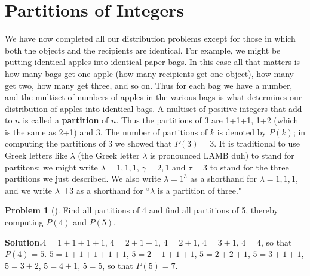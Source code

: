 \documentclass[10pt,]{book}
\newcommand{\terminology}[1]{\textbf{#1}}
\theoremstyle{plain}
\theoremstyle{definition}
\newtheorem{activity}[project]{Problem}
\theoremstyle{definition}
\numberwithin{equation}{chapter}
\begin{document}
\section[{Partitions of Integers}]{Partitions of Integers}\label{section-9}
We have now completed all our distribution problems except for those in which both the objects and the recipients are identical. For example, we might be putting identical apples into identical paper bags. In this case all that matters is how many bags get one apple (how many recipients get one object), how many get two, how many get three, and so on. Thus for each bag we have a number, and the multiset of numbers of apples in the various bags is what determines our distribution of apples into identical bags. A multiset of positive integers that add to \(n\) is called a \terminology{partition} of \(n\). Thus the partitions of 3 are 1+1+1, 1+2 (which is the same as 2+1) and 3. The number of partitions of \(k\) is denoted by \(P(k)\); in computing the partitions of 3 we showed that \(P(3) = 3\). It is traditional to use Greek letters like \(\lambda\) (the Greek letter \(\lambda\) is pronounced LAMB duh) to stand for partitons; we might write \(\lambda= 1,1,1\), \(\gamma= 2,1\) and \(\tau = 3\) to stand for the three partitions we just described. We also write \(\lambda = 1^3\) as a shorthand for \(\lambda = 1,1,1\), and we write \(\lambda \dashv 3\) as a shorthand for ``\(\lambda\) is a partition of three."%
\begin{activity}[]\label{activity-157}
Find all partitions of 4 and find all partitions of 5, thereby computing \(P(4)\) and \(P(5)\).%
\par\medskip\noindent%
\textbf{Solution.}\quad \(4=1+1+1+1\), \(4=2+1+1\), \(4=2+1\), \(4=3+1\), \(4=4\), so that \(P(4)=5\). \(5=1+1+1+1+1\), \(5=2+1+1+1\), \(5=2+2+1\), \(5=3+1+1\), \(5=3+2\), \(5=4+1\), \(5=5\), so that \(P(5)=7\).%
\end{activity}
\typeout{************************************************}
\typeout{************************************************}
\end{document}
